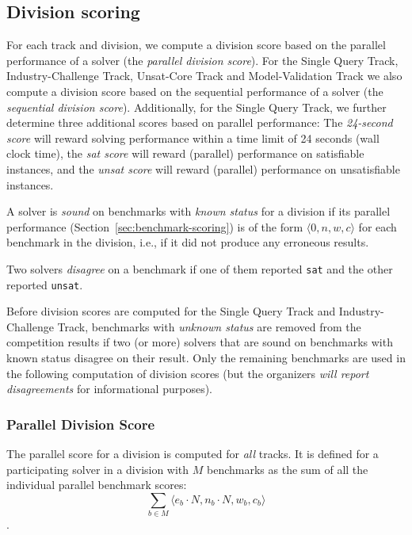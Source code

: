 \documentclass[12pt]{article}
\newcommand{\maintrack}{Single Query Track\xspace}
\newcommand{\ucoretrack}{Unsat-Core Track\xspace}
\newcommand{\mvaltrack}{Model-Validation Track\xspace}
\newcommand{\challtrack}{Industry-Challenge Track\xspace}
\begin{document}
\subsection{Division scoring}
\label{sec:division-scoring}

For each track and division, we compute a division score based on the parallel
performance of a solver (the \emph{parallel division score}).  For the
\maintrack, \challtrack, \ucoretrack and \mvaltrack we also compute a division
score based on the sequential performance of a solver (the \emph{sequential
division score}).  Additionally, for the \maintrack, we further determine three
additional scores based on parallel performance: The \emph{24-second score}
will reward solving performance within a time limit of 24 seconds (wall clock
time), the \emph{sat score} will reward (parallel) performance on satisfiable
instances, and the \emph{unsat score} will reward (parallel) performance on
unsatisfiable instances.

A solver is \emph{sound} on benchmarks with \emph{known status} for a division
if its parallel performance (Section~\ref{sec:benchmark-scoring}) is of the
form $\langle 0, n, w, c\rangle$ for each benchmark in the division, i.e., if
it did not produce any erroneous results.

Two solvers \emph{disagree} on a benchmark if one of them reported \texttt{sat}
and the other reported \texttt{unsat}.

Before division scores are computed for the \maintrack and \challtrack,
benchmarks with \emph{unknown status} are removed from the competition results
if two (or more) solvers that are sound on benchmarks with known status
disagree on their result.
%
Only the remaining benchmarks are used in the following computation of division
scores (but the organizers \emph{will report disagreements} for informational
purposes).

\subsubsection{Parallel Division Score}

The parallel score for a division is computed for \emph{all} tracks.  It is
defined for a participating solver in a division with $M$ benchmarks as the sum
of all the individual parallel benchmark scores:
$$\sum_{b\in M} \langle e_b \cdot N, n_b \cdot N, w_b, c_b\rangle$$.
\end{document}
